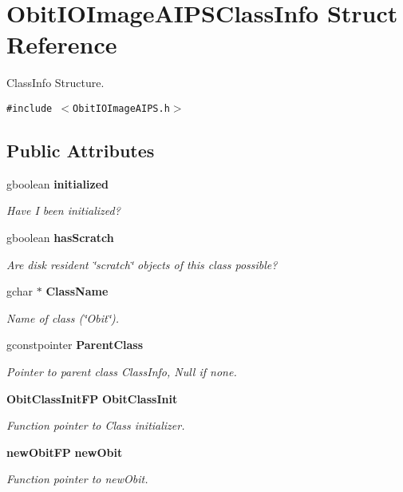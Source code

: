 \section{Obit\-IOImage\-AIPSClass\-Info Struct Reference}
\label{structObitIOImageAIPSClassInfo}
Class\-Info Structure.  


{\tt \#include $<$Obit\-IOImage\-AIPS.h$>$}

\subsection*{Public Attributes}
\begin{CompactItemize}
\item 
gboolean {\bf initialized}
\begin{CompactList}\small\item\em Have I been initialized? \item\end{CompactList}\item 
gboolean {\bf has\-Scratch}
\begin{CompactList}\small\item\em Are disk resident \char`\"{}scratch\char`\"{} objects of this class possible? \item\end{CompactList}\item 
gchar $\ast$ {\bf Class\-Name}
\begin{CompactList}\small\item\em Name of class (\char`\"{}Obit\char`\"{}). \item\end{CompactList}\item 
gconstpointer {\bf Parent\-Class}
\begin{CompactList}\small\item\em Pointer to parent class Class\-Info, Null if none. \item\end{CompactList}\item 
{\bf Obit\-Class\-Init\-FP} {\bf Obit\-Class\-Init}
\begin{CompactList}\small\item\em Function pointer to Class initializer. \item\end{CompactList}\item 
{\bf new\-Obit\-FP} {\bf new\-Obit}
\begin{CompactList}\small\item\em Function pointer to new\-Obit. \item\end{CompactList}\item 

\end{CompactItemize}
